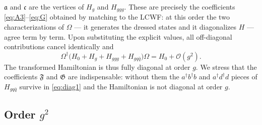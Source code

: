 \documentclass[11pt,a4paper]{article}
\numberwithin{equation}{section}
\newcommand{\mf}[1]{\mathfrak{#1}}
\newcommand{\dg}{\dagger}
\newcommand{\OM}{\Omega}
\newcommand{\order}[1]{\mathcal{O}(#1)}
\begin{document}
$\mf a$ and $\mf c$ are the vertices of $H_{g}$ and $H_{ggg}$. These are precisely the coefficients
\eqref{eq:A3}--\eqref{eq:G} obtained by matching to the LCWF: at this order the two characterizations of
$\OM$ --- it generates the dressed states and it diagonalizes $H$ --- agree term by term. Upon
substituting the explicit values, all off-diagonal contributions cancel identically and
\begin{equation}
\OM^{\dg}\big(H_{0}+H_{g}+H_{ggg}+H_{gq\bar q}\big)\OM=H_{0}+\order{g^{2}} .
\label{eq:diag1res}
\end{equation}
The transformed Hamiltonian is thus fully diagonal at order $g$. We stress that the coefficients
$\mf F$ and $\mf G$ are indispensable: without them the $a^{\dg}b^{\dg}b$ and $a^{\dg}d^{\dg}d$ pieces of
$H_{gq\bar q}$ survive in \eqref{eq:diag1} and the Hamiltonian is not diagonal at order $g$.

\subsection{Order $g^{2}$}
\end{document}
